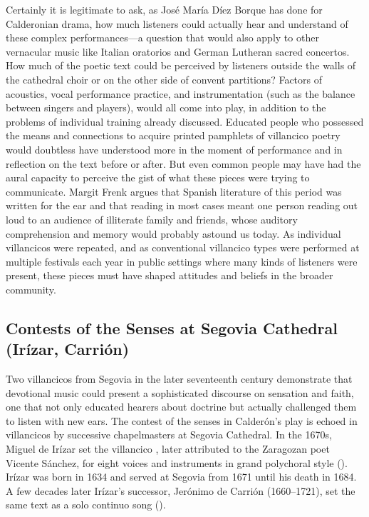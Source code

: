 Certainly it is legitimate to ask, as José María Díez Borque has done for
Calderonian drama, how much listeners could actually hear and understand of
these complex performances---a question that would also apply to other
vernacular music like Italian oratorios and German Lutheran sacred concertos.%
    \Autocite{DiezBorque:Publico}
How much of the poetic text could be perceived by listeners outside the walls of
the cathedral choir or on the other side of convent partitions? Factors of
acoustics, vocal performance practice, and instrumentation (such as the balance
between singers and players), would all come into play, in addition to the
problems of individual training already discussed.  
Educated people who possessed the means and connections to acquire printed
pamphlets of villancico poetry would doubtless have understood more in the
moment of performance and in reflection on the text before or after.
But even common people may have had the aural capacity to perceive the gist of
what these pieces were trying to communicate.
Margit Frenk argues that Spanish literature of this period was written for the
ear and that reading in most cases meant one person reading out loud to an
audience of illiterate family and friends, whose auditory comprehension and
memory would probably astound us today.%
    \Autocite{Frenk:Voz}  
As individual villancicos were repeated, and as conventional villancico types
were performed at multiple festivals each year in public settings where many
kinds of listeners were present, these pieces must have shaped attitudes and
beliefs in the broader community.


\subsection{Contests of the Senses at Segovia Cathedral (Irízar, Carrión)}

Two villancicos from Segovia in the later seventeenth century demonstrate that
devotional music could present a sophisticated discourse on sensation and faith,
one that not only educated hearers about doctrine but actually challenged them
to listen with new ears.  
The contest of the senses in Calderón's play is echoed in villancicos by
successive chapelmasters at Segovia Cathedral.
In the 1670s, Miguel de Irízar set the villancico , later attributed to the Zaragozan poet Vicente Sánchez,
for eight voices and instruments in grand polychoral style ().%
    \Autocite{LopezCalo:Segovia}
Irízar was born in 1634 and served at Segovia from 1671 until his death in 1684.
A few decades later Irízar's successor, Jerónimo de Carrión (1660--1721), set
the same text as a solo continuo song ().%
    \Autocite[133--152]{Cashner:WLSCM32}

